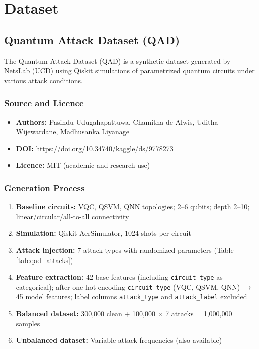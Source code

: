 \section{Dataset}
\label{sec:dataset}

\subsection{Quantum Attack Dataset (QAD)}
\label{sec:qad}

The Quantum Attack Dataset (QAD) is a synthetic dataset generated by NetsLab (UCD) using Qiskit simulations of parametrized quantum circuits under various attack conditions.

\subsubsection{Source and Licence}
\begin{itemize}
    \item \textbf{Authors:} Pasindu Udugahapattuwa, Chamitha de Alwis, Uditha Wijewardane, Madhusanka Liyanage
    \item \textbf{DOI:} \url{https://doi.org/10.34740/kaggle/ds/9778273}
    \item \textbf{Licence:} MIT (academic and research use)
\end{itemize}

\subsubsection{Generation Process}
\begin{enumerate}
    \item \textbf{Baseline circuits:} VQC, QSVM, QNN topologies; 2--6 qubits; depth 2--10; linear/circular/all-to-all connectivity
    \item \textbf{Simulation:} Qiskit AerSimulator, 1024 shots per circuit
    \item \textbf{Attack injection:} 7 attack types with randomized parameters (Table \ref{tab:qad_attacks})
    \item \textbf{Feature extraction:} 42 base features (including \texttt{circuit\_type} as categorical); after one-hot encoding \texttt{circuit\_type} (VQC, QSVM, QNN) $\to$ 45 model features; label columns \texttt{attack\_type} and \texttt{attack\_label} excluded
    \item \textbf{Balanced dataset:} 300,000 clean + 100,000 $\times$ 7 attacks = 1,000,000 samples
    \item \textbf{Unbalanced dataset:} Variable attack frequencies (also available)
\end{enumerate}

